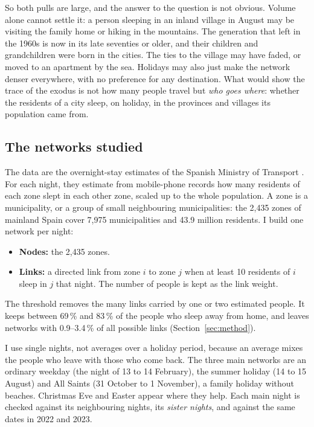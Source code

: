 So both pulls are large, and the answer to the question is not obvious. Volume alone cannot settle it: a person sleeping in an inland village in August may be visiting the family home or hiking in the mountains. The generation that left in the 1960s is now in its late seventies or older, and their children and grandchildren were born in the cities. The ties to the village may have faded, or moved to an apartment by the sea. Holidays may also just make the network denser everywhere, with no preference for any destination. What would show the trace of the exodus is not how many people travel but \emph{who goes where}: whether the residents of a city sleep, on holiday, in the provinces and villages its population came from.

\subsection{The networks studied}

The data are the overnight-stay estimates of the Spanish Ministry of Transport \citep{mitms2024methodology}. For each night, they estimate from mobile-phone records how many residents of each zone slept in each other zone, scaled up to the whole population. A zone is a municipality, or a group of small neighbouring municipalities: the 2,435 zones of mainland Spain cover 7,975 municipalities and 43.9 million residents. I build one network per night:
\begin{itemize}
\item \textbf{Nodes:} the 2,435 zones.
\item \textbf{Links:} a directed link from zone $i$ to zone $j$ when at least 10 residents of $i$ sleep in $j$ that night. The number of people is kept as the link weight.
\end{itemize}
The threshold removes the many links carried by one or two estimated people. It keeps between 69\,\% and 83\,\% of the people who sleep away from home, and leaves networks with 0.9--3.4\,\% of all possible links (Section~\ref{sec:method}).

I use single nights, not averages over a holiday period, because an average mixes the people who leave with those who come back. The three main networks are an ordinary weekday (the night of 13 to 14 February), the summer holiday (14 to 15 August) and All Saints (31 October to 1 November), a family holiday without beaches. Christmas Eve and Easter appear where they help. Each main night is checked against its neighbouring nights, its \emph{sister nights}, and against the same dates in 2022 and 2023.

